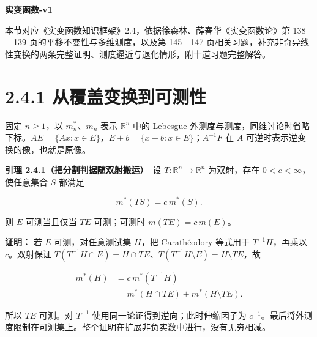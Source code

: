 \documentclass[11pt,a4paper]{article}
\begin{document}
\begin{center}
{\Large\bfseries 实变函数-v1\par}
\vspace{7pt}{\large 2.4 测度的变换性质\par}
\vspace{5pt}{第二章 Lebesgue 测度\par}
\end{center}
本节对应《实变函数知识框架》2.4，依据徐森林、薛春华《实变函数论》第 138—139 页的平移不变性与多维测度，以及第 145—147 页相关习题，补充非奇异线性变换的两条完整证明、测度逼近与退化情形，附十道习题完整解答。
\begingroup\setlength{\parskip}{0pt}\tableofcontents\endgroup

\section[\S{}2.4.1
从覆盖变换到可测性]{2.4.1
从覆盖变换到可测性}\label{ux4eceux8986ux76d6ux53d8ux6362ux5230ux53efux6d4bux6027}

固定 \(n\ge1\)，以 \(m_n^*\)、\(m_n\) 表示 \(\mathbb R^n\) 中的 Lebesgue
外测度与测度，同维讨论时省略下标。\(AE=\{Ax:x\in E\}\)，\(E+b=\{x+b:x\in E\}\)；\(A^{-1}F\)
在 \(A\) 可逆时表示逆变换的像，也就是原像。

\textbf{引理 2.4.1（把分割判据随双射搬运）}　设
\(T:\mathbb R^n\to\mathbb R^n\) 为双射，存在 \(0<c<\infty\)，使任意集合
\(S\) 都满足

\begin{equation*}
m^*(TS)=c\,m^*(S).
\tag{2.4.1}
\end{equation*}

则 \(E\) 可测当且仅当 \(TE\) 可测；可测时 \(m(TE)=c\,m(E)\)。

\textbf{证明：} 若 \(E\) 可测，对任意测试集 \(H\)，把 Carathéodory
等式用于 \(T^{-1}H\)，再乘以 \(c\)。双射保证
\(T(T^{-1}H\cap E)=H\cap TE\)、\(T(T^{-1}H\setminus E)=H\setminus TE\)，故

\begin{equation*}
\begin{aligned}
m^*(H)&=c\,m^*(T^{-1}H)\\
&=m^*(H\cap TE)+m^*(H\setminus TE).
\end{aligned}
\tag{2.4.2}
\end{equation*}

所以 \(TE\) 可测。对 \(T^{-1}\) 使用同一论证得到逆向；此时伸缩因子为
\(c^{-1}\)。最后将外测度限制在可测集上。整个证明在扩展非负实数中进行，没有无穷相减。
\end{document}
